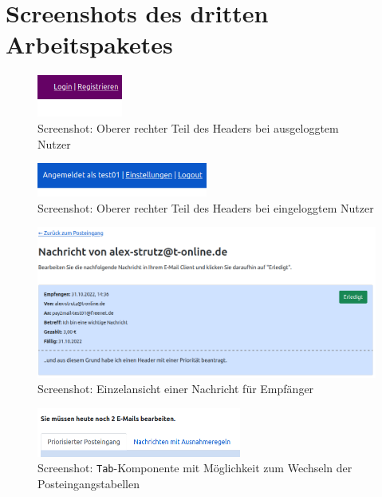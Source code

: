 \newpage
\section{Screenshots des dritten Arbeitspaketes}

\begin{figure}[!h]
	\centering
		\includegraphics[width=0.25\textwidth]{Figures/header1.png}
	\caption{Screenshot: Oberer rechter Teil des Headers bei ausgeloggtem Nutzer}
	\label{fig:screenshot_header1}
\end{figure}

\begin{figure}[!h]
	\centering
		\includegraphics[width=0.5\textwidth]{Figures/header2.png}
	\caption{Screenshot: Oberer rechter Teil des Headers bei eingeloggtem Nutzer}
	\label{fig:screenshot_header2}
\end{figure}

\begin{figure}[!h]
	\centering
		\includegraphics[width=1.1\textwidth]{Figures/message.png}
	\caption{Screenshot: Einzelansicht einer Nachricht für Empfänger}
	\label{fig:screenshot_message}
\end{figure}

\begin{figure}[!h]
	\centering
		\includegraphics[width=0.6\textwidth]{Figures/tab.png}
	\caption[Screenshot: \texttt{Tab}-Komponente der Posteingangstabellen]{Screenshot: \texttt{Tab}-Komponente mit Möglichkeit zum Wechseln der Posteingangstabellen}
	\label{fig:screenshot_inbox2}
\end{figure}

